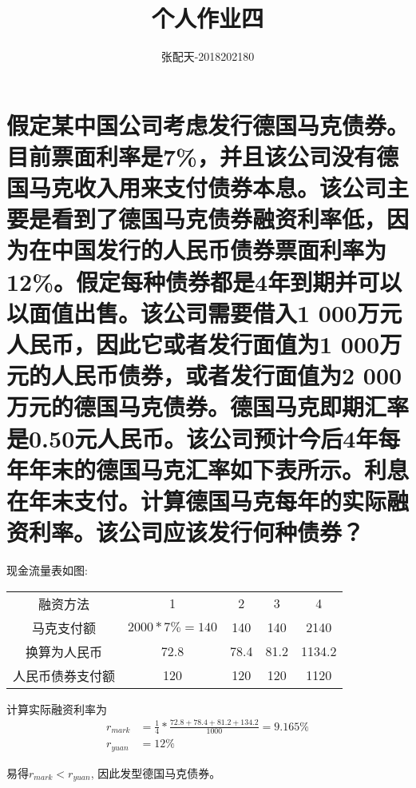 \documentclass[UTF8]{ctexart}
\author{张配天-2018202180}
\title{个人作业四}
\begin{document}
    \maketitle
    \section{假定某中国公司考虑发行德国马克债券。目前票面利率是7\%，并且该公司没有德国马克收入用来支付债券本息。该公司主要是看到了德国马克债券融资利率低，因为在中国发行的人民币债券票面利率为12\%。假定每种债券都是4年到期并可以以面值出售。该公司需要借入1 000万元人民币，因此它或者发行面值为1 000万元的人民币债券，或者发行面值为2 000万元的德国马克债券。德国马克即期汇率是0.50元人民币。该公司预计今后4年每年年末的德国马克汇率如下表所示。利息在年末支付。计算德国马克每年的实际融资利率。该公司应该发行何种债券？}
    现金流量表如图:\begin{table}[H]
        \centering
        \begin{tabular}[]{ccccc}
            \hline
            融资方法&1&2&3&4\\
            马克支付额&$2000*7\% = 140$&140&140&2140\\
            换算为人民币&72.8&78.4&81.2&1134.2\\
            人民币债券支付额&120&120&120&1120\\
            \hline
        \end{tabular}
    \end{table}
    计算实际融资利率为\begin{align}
        r_{mark} &= \frac{1}{4} * \frac{72.8+78.4+81.2+134.2}{1000} = 9.165\%\\
        r_{yuan} &= 12\%
    \end{align}
    \par 易得$r_{mark} < r_{yuan}$, 因此发型德国马克债券。
        
\end{document}
